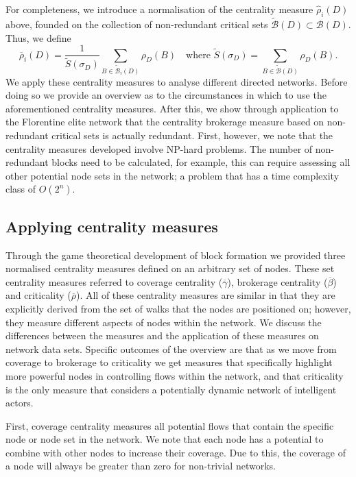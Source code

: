 For completeness, we introduce a normalisation of the centrality measure $\widehat{\rho}_i (D)$ above, founded on the collection of non-redundant critical sets $\widetilde{\mathcal{B}} (D) \subset \mathcal{B} (D)$. Thus, we define
\begin{equation}
\overline{\rho}_i (D) = \frac{1}{\widetilde{S} (\sigma_D)} \sum_{B \in \widetilde{\mathcal{B}}_i (D)} \rho_D (B) \quad \mbox{where } \widetilde{S} (\sigma_D) = \sum_{B \in \widetilde{\mathcal{B}} (D)} \rho_D (B) .
\end{equation}
We apply these centrality measures to analyse different directed networks. Before doing so we provide an overview as to the circumstances in which to use the aforementioned centrality measures. After this, we show through application to the Florentine elite network that the centrality brokerage measure based on non-redundant critical sets is actually redundant. First, however, we note that the centrality measures developed involve NP-hard problems. The number of non-redundant blocks need to be calculated, for example, this can require assessing all other potential node sets in the network; a problem that has a time complexity class of $O(2^n)$.

\subsection{Applying centrality measures}

Through the game theoretical development of block formation we provided three normalised centrality measures defined on an arbitrary set of nodes. These set centrality measures referred to coverage centrality ($\overline{\gamma}$), brokerage centrality ($\overline{\beta}$) and criticality ($\overline{\rho}$). All of these centrality measures are similar in that they are explicitly derived from the set of walks that the nodes are positioned on; however, they measure different aspects of nodes within the network. We discuss the differences between the measures and the application of these measures on network data sets. Specific outcomes of the overview are that as we move from coverage to brokerage to criticality we get measures that specifically highlight more powerful nodes in controlling flows within the network, and that criticality is the only measure that considers a potentially dynamic network of intelligent actors.

First, coverage centrality measures all potential flows that contain the specific node or node set in the network. We note that each node has a potential to combine with other nodes to increase their coverage. Due to this, the coverage of a node will always be greater than zero for non-trivial networks.

